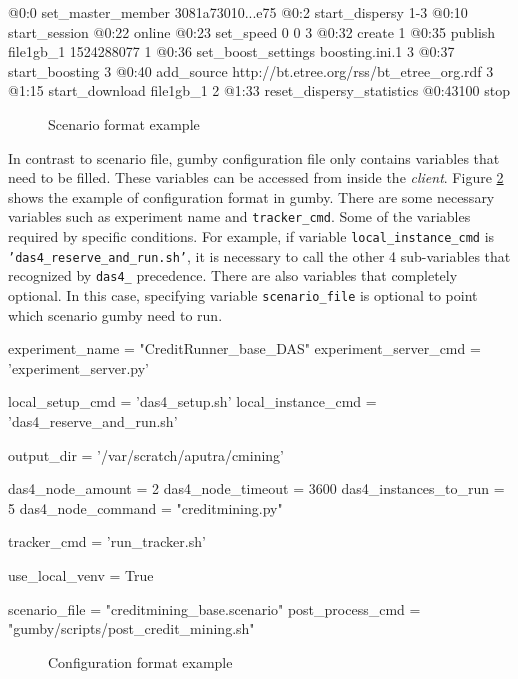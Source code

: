 \begin{verbbox}
@0:0 set_master_member 3081a73010...e75
@0:2 start_dispersy {1-3}
@0:10 start_session
@0:22 online
@0:23 set_speed 0 0 {3}
@0:32 create {1}
@0:35 publish file1gb_1 1524288077 {1}
@0:36 set_boost_settings boosting.ini.1 {3}
@0:37 start_boosting {3}
@0:40 add_source http://bt.etree.org/rss/bt_etree_org.rdf {3}
@1:15 start_download file1gb_1 {2}
@1:33 reset_dispersy_statistics
@0:43100 stop
\end{verbbox}

\begin{figure}[h]
	\fbox{\theverbbox}
	\caption{Scenario format example}
	\label{fig:gumbyscenario}
\end{figure}

In contrast to scenario file, gumby configuration file only contains variables that need to be filled. These variables can be accessed from inside the \textit{client}. Figure \ref{fig:gumbyconf} shows the example of configuration format in gumby. There are some necessary variables such as experiment name and \texttt{tracker\_cmd}. Some of the variables required by specific conditions. For example, if variable \texttt{local\_instance\_cmd} is \texttt{'das4\_reserve\_and\_run.sh'}, it is necessary to call the other 4 sub-variables that recognized by \texttt{das4\_} precedence. There are also variables that completely optional. In this case, specifying variable \texttt{scenario\_file} is optional to point which scenario gumby need to run.

\begin{verbbox}
experiment_name = "CreditRunner_base_DAS"
experiment_server_cmd = 'experiment_server.py'

local_setup_cmd = 'das4_setup.sh'
local_instance_cmd = 'das4_reserve_and_run.sh'

output_dir = '/var/scratch/aputra/cmining'

das4_node_amount = 2
das4_node_timeout = 3600
das4_instances_to_run = 5
das4_node_command = "creditmining.py"

tracker_cmd = 'run_tracker.sh'

use_local_venv = True

scenario_file = "creditmining_base.scenario"
post_process_cmd = "gumby/scripts/post_credit_mining.sh"
\end{verbbox}

\begin{figure}[h!]
	\fbox{\theverbbox}
	\caption{Configuration format example}
	\label{fig:gumbyconf}
\end{figure}

